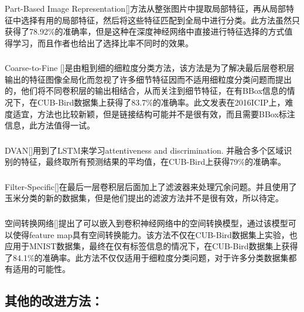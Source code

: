 \documentclass[UTF8]{article}
\begin{document}
\subsubsection{{\color{BLUE}{Part-Based Image Representation}}}
Part-Based Image Representation\cite{partrepresentation}[{\color{GREY}{弱监督 }}]方法从整张图片中提取局部特征，再从局部特征中选择有用的局部特征，然后将这些特征匹配到全局中进行分类。此方法虽然只获得了78.92\%的准确率，但是这种在深度神经网络中直接进行特征选择的方式值得学习，而且作者也给出了选择比率不同时的效果。
\subsubsection{{\color{GREEN}{Coarse-to-Fine}}}
Coarse-to-Fine\cite{coarsetofine} [{\color{GREY}{强监督 }}]是由粗到细的细粒度分类方法，该方法是为了解决最后层卷积层输出的特征图像全局化而忽视了许多细节特征因而不适用细粒度分类问题而提出的，他们将不同卷积层的输出相结合，从而关注到细节特征，在有BBox信息的情况下，在CUB-Bird数据集上获得了83.7\%的准确率。此文发表在2016ICIP上，难度适宜，方法也比较新颖，但是链接结构可能并不是很有效，而且需要BBox标注信息，此方法值得一试。
\subsubsection{{\color{red}{DVAN}}}
DVAN\cite{DVAN}[{\color{GREY}{弱监督 }}]用到了LSTM来学习attentiveness and discrimination. 并融合多个区域识别的特征，最终取所有预测结果的平均值，在CUB-Bird上获得79\%的准确率。
\subsubsection{{\color{BLUE}{Filter-Specific}}}
Filter-Specific\cite{FS}[{\color{GREY}{弱监督 }}]在最后一层卷积层后面加上了滤波器来处理冗余问题。并且使用了玉米分类的新的数据集，但是他们提出的滤波方法并不是很有效，所以待定。
\subsubsection{{\color{GREEN}{Transformer Networks}}}
空间转换网络\cite{spatial}[{\color{GREY}{弱监督 }}]提出了可以嵌入到卷积神经网络中的空间转换模型，通过该模型可以使得feature map具有空间转换能力。该方法不仅在CUB-Bird数据集上实验，也应用于MNIST数据集，最终在仅有标签信息的情况下，在CUB-Bird数据集上获得了84.1\%的准确率。此方法不仅仅适用于细粒度分类问题，对于许多分类数据集都有适用的可能性。

\subsection{其他的改进方法：}

\end{document}
